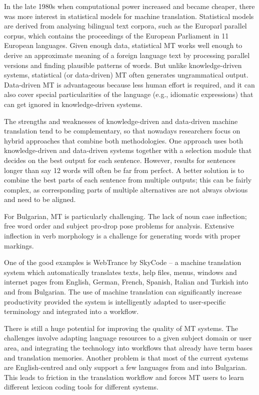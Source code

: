 \begin{multicols}{2}
In the late 1980s when computational power increased and became cheaper, there was more interest in statistical models for machine translation. Statistical models are derived from analysing bilingual text corpora, such as the Europarl parallel corpus, which contains the proceedings of the European Parliament in 11 European languages. Given enough data, statistical MT works well enough to derive an approximate meaning of a foreign language text by processing parallel versions and finding plausible patterns of words. But unlike knowledge-driven systems, statistical (or data-driven) MT often generates ungrammatical output. Data-driven MT is advantageous because less human effort is required, and it can also cover special particularities of the language (e.g., idiomatic expressions) that can get ignored in knowledge-driven systems. 

The strengths and weaknesses of knowledge-driven and data-driven machine translation tend to be complementary, so that nowadays researchers focus on hybrid approaches that combine both methodologies. One approach uses both knowledge-driven and data-driven systems together with a selection module that decides on the best output for each sentence. However, results for sentences longer than say 12 words will often be far from perfect. A better solution is to combine the best parts of each sentence from multiple outputs; this can be fairly complex, as corresponding parts of multiple alternatives are not always obvious and need to be aligned. 

For Bulgarian, MT is particularly challenging. The lack of noun case inflection; free word order and subject pro-drop pose problems for analysis. Extensive inflection in verb morphology is a challenge for generating words with proper markings. 

One of the good examples is WebTrance by SkyCode – a machine translation system which automatically translates texts, help files, menus, windows and internet pages from English, German, French, Spanish, Italian and Turkish into and from Bulgarian.  The use of machine translation can significantly increase productivity provided the system is intelligently adapted to user-specific terminology and integrated into a workflow. 

There is still a huge potential for improving the quality of MT systems. The challenges involve adapting language resources to a given subject domain or user area, and integrating the technology into workflows that already have term bases and translation memories. Another problem is that most of the current systems are English-centred and only support a few languages from and into Bulgarian. This leads to friction in the translation workflow and forces MT users to learn different lexicon coding tools for different systems.


\end{multicols}
